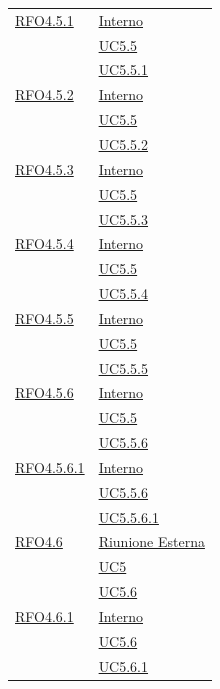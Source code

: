 \begin{longtable}{|>{\centering}m{5cm}|m{5cm}<{\centering}|}
\hyperlink{RFO4.5.1}{RFO4.5.1} & \hyperlink{Interno}{Interno}\\
& \hyperref[UC5.5]{UC5.5}\\
& \hyperref[UC5.5.1]{UC5.5.1}\\ \hline

\hyperlink{RFO4.5.2}{RFO4.5.2} & \hyperlink{Interno}{Interno}\\
& \hyperref[UC5.5]{UC5.5}\\
& \hyperref[UC5.5.2]{UC5.5.2}\\ \hline

\hyperlink{RFO4.5.3}{RFO4.5.3} & \hyperlink{Interno}{Interno}\\
& \hyperref[UC5.5]{UC5.5}\\
& \hyperref[UC5.5.3]{UC5.5.3}\\ \hline

\hyperlink{RFO4.5.4}{RFO4.5.4} & \hyperlink{Interno}{Interno}\\
& \hyperref[UC5.5]{UC5.5}\\
& \hyperref[UC5.5.4]{UC5.5.4}\\ \hline

\hyperlink{RFO4.5.5}{RFO4.5.5} & \hyperlink{Interno}{Interno}\\
& \hyperref[UC5.5]{UC5.5}\\
& \hyperref[UC5.5.5]{UC5.5.5}\\ \hline

\hyperlink{RFO4.5.6}{RFO4.5.6} & \hyperlink{Interno}{Interno}\\
& \hyperref[UC5.5]{UC5.5}\\
& \hyperref[UC5.5.6]{UC5.5.6}\\ \hline

\hyperlink{RFO4.5.6.1}{RFO4.5.6.1} & \hyperlink{Interno}{Interno}\\
& \hyperref[UC5.5.6]{UC5.5.6}\\
& \hyperref[UC5.5.6.1]{UC5.5.6.1}\\ \hline

\hyperlink{RFO4.6}{RFO4.6} & \hyperlink{Riunione Esterna}{Riunione Esterna}\\
& \hyperref[UC5]{UC5}\\
& \hyperref[UC5.6]{UC5.6}\\ \hline

\hyperlink{RFO4.6.1}{RFO4.6.1} & \hyperlink{Interno}{Interno}\\
& \hyperref[UC5.6]{UC5.6}\\
& \hyperref[UC5.6.1]{UC5.6.1}\\ \hline


\end{longtable}

